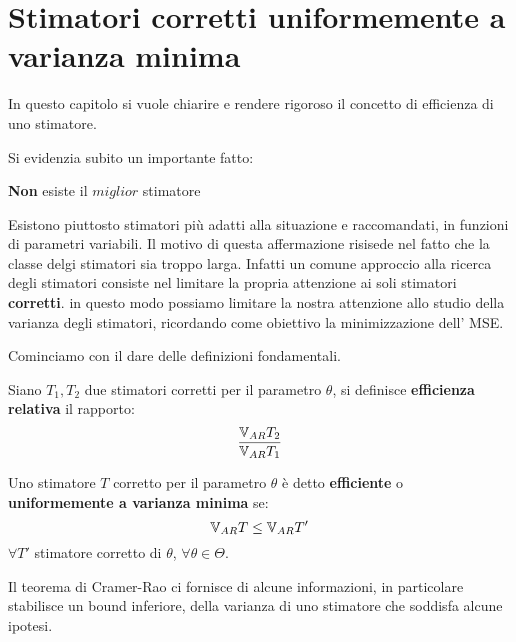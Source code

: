 \section{Stimatori corretti uniformemente a varianza minima}

In questo capitolo si vuole chiarire e rendere rigoroso il concetto di efficienza di uno stimatore.

Si evidenzia subito un importante fatto:
\begin{center}
    \textbf{Non} esiste il $miglior$ stimatore
\end{center}
Esistono piuttosto stimatori più adatti alla situazione e raccomandati, in funzioni di parametri variabili. Il motivo di questa affermazione risisede nel fatto che la classe delgi stimatori sia troppo larga. Infatti un comune approccio alla ricerca degli stimatori consiste nel limitare la propria attenzione ai soli stimatori \textbf{corretti}. in questo modo possiamo limitare la nostra attenzione allo studio della varianza degli stimatori, ricordando come obiettivo la minimizzazione dell' MSE.


Cominciamo con il dare delle definizioni fondamentali.
\begin{definition}
Siano $T_1,T_2$ due stimatori corretti per il parametro $\theta$, si definisce \textbf{efficienza relativa} il rapporto: \[\frac{\mathbb{V}_{AR} T_2}{\mathbb{V}_{AR} T_1}\]
\end{definition}

\vspace{5px}

\begin{definition}
Uno stimatore $T$ corretto per il parametro $\theta$ è detto \textbf{efficiente} o \textbf{uniformemente a varianza minima} se: \[\mathbb{V}_{AR} T\leq \mathbb{V}_{AR} T'\]
$\forall T'$ stimatore corretto di $\theta$, $\forall\theta\in\Theta$.
\end{definition}


Il teorema di Cramer-Rao ci fornisce di alcune informazioni, in particolare stabilisce un bound inferiore, della varianza di uno stimatore che soddisfa alcune ipotesi.

